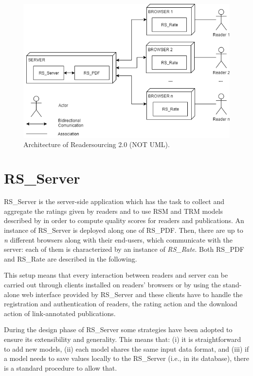 \documentclass[a4paper, english]{article}
\begin{document}
\begin{figure}[h]
\centering
\includegraphics[width=\textwidth]{figures/architecture.png}
\caption{Architecture of Readersourcing 2.0 (NOT UML).}
\label{fig:architecture}
\end{figure}

\section{RS\_Server}

\label{rs-server}

RS\_Server \cite{RS-Server} is the server-side application which has the task to collect and aggregate the ratings given by readers and to use RSM and TRM models described by \citet{Soprano2019} in order to compute quality scores for readers and publications. An instance of RS\_Server is deployed along one of RS\_PDF.
Then, there are up to \emph{n} different browsers along with their end-users, which communicate with the server: each of them is characterized by an instance of \emph{RS\_Rate}. Both RS\_PDF and RS\_Rate are described in the following. 

This setup means that every interaction between readers and server can be carried out through clients installed on readers' browsers or by using the stand-alone web interface provided by RS\_Server and these clients have to handle the registration and authentication of readers, the rating action and the download action of link-annotated publications. 

During the design phase of RS\_Server some strategies have been adopted to ensure its extensibility and generality. This means that: (i) it is straightforward to add new models, (ii) each model shares the same input data format, and (iii) if a model needs to save values locally to the RS\_Server (i.e., in its database), there is a standard procedure to allow that.
\end{document}
